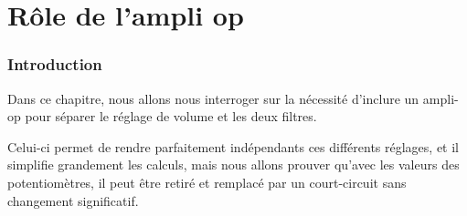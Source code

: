 \chapter{Rôle de l'ampli op}
\label{chap:ampli-op}

\subsection*{Introduction}

Dans ce chapitre, nous allons nous interroger sur la nécessité
d'inclure un ampli-op pour séparer le réglage de volume
et les deux filtres.

Celui-ci permet de rendre parfaitement indépendants ces différents
réglages, et il simplifie grandement les calculs,
mais nous allons prouver qu'avec les valeurs des potentiomètres,
il peut être retiré et remplacé par un court-circuit
sans changement significatif.
